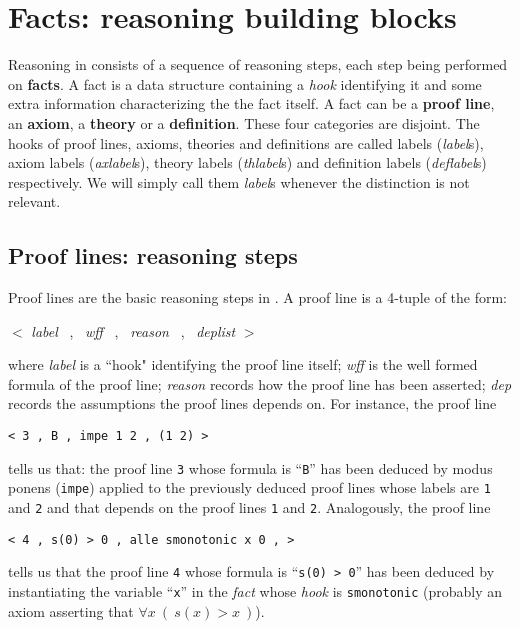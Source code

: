\section{Facts: reasoning building blocks}
\label{sec-reas}

Reasoning in {\GF} consists of a sequence of reasoning steps, each step being
performed on {\bf facts}.
A fact is a data structure containing a {\em hook} identifying it and some extra
information characterizing the the fact itself.
A fact can be a {\bf proof line}, an {\bf axiom}, a {\bf theory} or a {\bf
definition}.
These four categories are disjoint.
The hooks of proof lines, axioms, theories and definitions are called labels
({\em label}s), axiom labels ({\em axlabel}s), theory labels ({\em thlabel}s)
and definition labels ({\em deflabel}s) respectively.
We will simply call them {\em label}s whenever the distinction is not relevant.


\subsection{Proof lines: reasoning steps}
\label{sec-proofline}

Proof lines are the basic reasoning steps in {\GF}.
A proof line is a 4-tuple of the form: 

\begin{center}
$<$ {\em label} \ , \ {\em wff} \ , \ {\em reason} \ , \ {\em deplist} $>$
\end{center}

where
{\em label} is a ``hook" identifying the proof line itself; {\em wff} is the
well formed formula of the proof line; {\em reason} records how the proof line
has been asserted; {\em dep} records the assumptions the proof lines depends on.
For instance, the proof line 
%
\begin{center}
	{\tt < 3 , B , impe 1 2 , (1 2) >}
\end{center}
%
tells us that: the proof line {\tt 3} whose formula is ``{\tt B}'' has been
deduced by modus ponens ({\tt impe}) applied to the previously deduced proof
lines whose labels are {\tt 1} and {\tt 2} and that depends on the proof lines
{\tt 1} and {\tt 2}.
Analogously, the proof line 
%
\begin{center}
	{\tt < 4 , s(0) > 0 , alle smonotonic x 0 ,  >}
\end{center}
%
tells us that the proof line {\tt 4} whose formula is ``{\tt s(0) > 0}'' has
been deduced by instantiating the variable ``{\tt x}'' in the {\em fact} whose
{\em hook} is {\tt smonotonic} (probably an axiom asserting that
$\forall x \ (\ s(x) > x\ )$).

